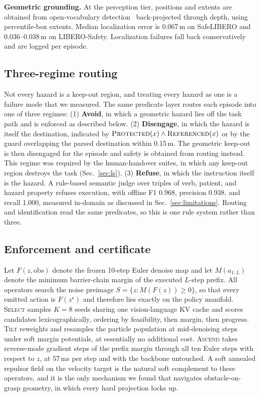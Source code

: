 \documentclass[conference]{IEEEtran}
\begin{document}
\textbf{Geometric grounding.} At the perception tier, positions and extents are obtained from open-vocabulary detection~\cite{gdino} back-projected through depth, using percentile-box extents. Median localization error is 0.067\,m on SafeLIBERO and 0.036--0.038\,m on LIBERO-Safety. Localization failures fall back conservatively and are logged per episode.

\subsection{Three-regime routing}
\label{sec:routing}

Not every hazard is a keep-out region, and treating every hazard as one is a failure mode that we measured. The same predicate layer routes each episode into one of three regimes:
(1) \textbf{Avoid}, in which a geometric hazard lies off the task path and is enforced as described below.
(2) \textbf{Disengage}, in which the hazard is itself the destination, indicated by $\textsc{Protected}(x)\wedge\textsc{Referenced}(x)$ or by the guard overlapping the parsed destination within 0.15\,m. The geometric keep-out is then disengaged for the episode and safety is obtained from routing instead. This regime was required by the human-handover suites, in which any keep-out region destroys the task (Sec.~\ref{sec:ls}).
(3) \textbf{Refuse}, in which the instruction itself is the hazard. A rule-based semantic judge over triples of verb, patient, and hazard property refuses execution, with offline F1 0.968, precision 0.938, and recall 1.000, measured in-domain as discussed in Sec.~\ref{sec:limitations}.
Routing and identification read the same predicates, so this is one rule system rather than three.

\subsection{Enforcement and certificate}
\label{sec:enforce}

Let $F(z,\mathrm{obs})$ denote the frozen 10-step Euler denoise map and let $M(a_{1:L})$ denote the minimum barrier-chain margin of the executed $L$-step prefix. All operators search the noise preimage $S=\{z: M(F(z))\ge0\}$, so that every emitted action is $F(z^\star)$ and therefore lies exactly on the policy manifold. \textsc{Select} samples $K{=}8$ seeds sharing one vision-language KV cache and scores candidates lexicographically, ordering by feasibility, then margin, then progress. \textsc{Tilt} reweights and resamples the particle population at mid-denoising steps under soft margin potentials, at essentially no additional cost. \textsc{Ascend} takes reverse-mode gradient steps of the prefix margin through all ten Euler steps with respect to $z$, at 57\,ms per step and with the backbone untouched. A soft annealed repulsor field on the velocity target is the natural soft complement to these operators, and it is the only mechanism we found that navigates obstacle-on-grasp geometry, in which every hard projection locks up.
\end{document}
